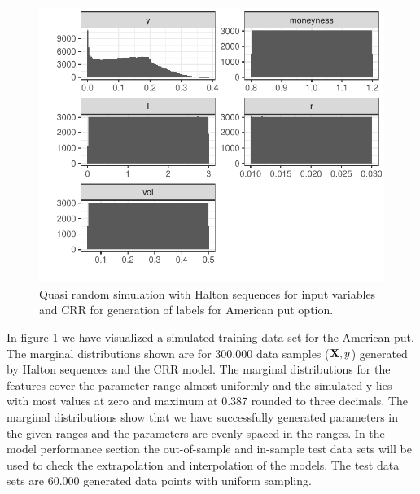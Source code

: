 \begin{figure}[th]
\centering
\includegraphics{Figures/marginalAmerPut.pdf}
\decoRule
\caption[Marginal Distributions for American Put]{Quasi random simulation with Halton sequences for input variables and CRR for generation of labels for American put option.}
\label{fig:marginalAmerPut}
\end{figure}

In figure \ref{fig:marginalAmerPut} we have visualized a simulated training data set for the American put. The marginal distributions shown are for $300.000$ data samples ($\mathbf{X},y$) generated by Halton sequences and the CRR model. The marginal distributions for the features cover the parameter range almost uniformly and the simulated y lies with most values at zero and maximum at 0.387 rounded to three decimals. The marginal distributions show that we have successfully generated parameters in the given ranges and the parameters are evenly spaced in the ranges. In the model performance section the out-of-sample and in-sample test data sets will be used to check the extrapolation and interpolation of the models. The test data sets are 60.000 generated data points with uniform sampling.


